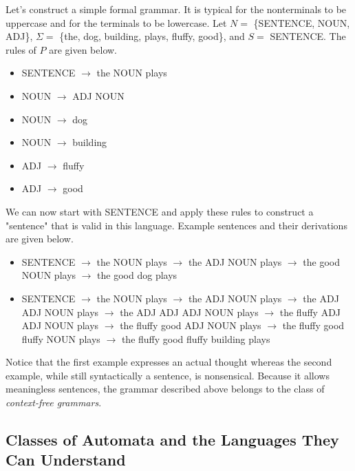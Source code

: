\begin{tcolorbox}[breakable, enhanced, colback=textbook-blue, sharp corners]
	Let's construct a simple formal grammar. It is typical for the nonterminals to be uppercase and for the terminals to be lowercase. Let $N=$ \{SENTENCE, NOUN, ADJ\}, $\Sigma=$ \{the, dog, building, plays, fluffy, good\}, and $S=$ SENTENCE. The rules of $P$ are given below.
	
	\begin{itemize}
		\item SENTENCE $\rightarrow$ the NOUN plays
		\item NOUN $\rightarrow$ ADJ NOUN
		\item NOUN $\rightarrow$ dog
		\item NOUN $\rightarrow$ building
		\item ADJ $\rightarrow$ fluffy
		\item ADJ $\rightarrow$ good
	\end{itemize}
	
	We can now start with SENTENCE and apply these rules to construct a "sentence" that is valid in this language. Example sentences and their derivations are given below.
	
	\begin{itemize}
		\item SENTENCE $\rightarrow$ the NOUN plays $\rightarrow$ the ADJ NOUN plays $\rightarrow$ the good NOUN plays $\rightarrow$ the good dog plays
		\item SENTENCE $\rightarrow$ the NOUN plays $\rightarrow$ the ADJ NOUN plays $\rightarrow$ the ADJ ADJ NOUN plays $\rightarrow$ the ADJ ADJ ADJ NOUN plays $\rightarrow$ the fluffy ADJ ADJ NOUN plays $\rightarrow$ the fluffy good ADJ NOUN plays $\rightarrow$ the fluffy good fluffy NOUN plays $\rightarrow$ the fluffy good fluffy building plays
	\end{itemize}
	
	Notice that the first example expresses an actual thought whereas the second example, while still syntactically a sentence, is nonsensical. Because it allows meaningless sentences, the grammar described above belongs to the class of \textit{context-free grammars}.
	
	\vspace{1mm}
\end{tcolorbox}
\vspace{7mm}


\subsection{Classes of Automata and the Languages They Can Understand}

